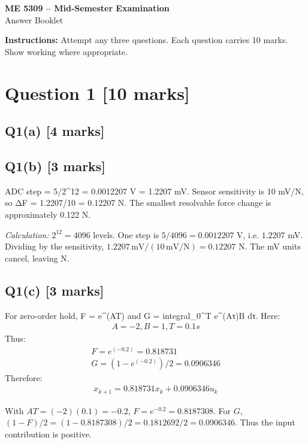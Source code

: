 \documentclass[11pt,a4paper]{article}
\begin{document}
\begin{center}
{\Large\bfseries ME 5309 -- Mid-Semester Examination}\\[3pt]
{\large Answer Booklet}\\[8pt]
\end{center}
\textbf{Instructions:} Attempt any three questions. Each question carries 10 marks. Show working where appropriate.
\section*{Question 1 \hfill [10 marks]}
\subsection*{Q1(a) \hfill [4 marks]}

\vspace{2mm}

\subsection*{Q1(b) \hfill [3 marks]}

ADC step = 5/2\textasciicircum{}12 = 0.0012207 V = 1.2207 mV.
Sensor sensitivity is 10 mV/N, so ΔF = 1.2207/10 = 0.12207 N.
The smallest resolvable force change is approximately 0.122 N.\par\smallskip\textit{Calculation:} $2^{12}=4096$ levels. One step is $5/4096=0.0012207$ V, i.e. $1.2207$ mV. Dividing by the sensitivity, $1.2207\,\mathrm{mV}/(10\,\mathrm{mV/N})=0.12207$ N. The mV units cancel, leaving N.

\subsection*{Q1(c) \hfill [3 marks]}

For zero-order hold, F = e\textasciicircum{}(AT) and G = integral\_0\textasciicircum{}T e\textasciicircum{}(Aτ)B dτ.
Here:\[\begin{aligned}A = -2, B = 1, T = 0.1 s\end{aligned}\]
Thus:\[\begin{aligned}F = e^(-0.2) = 0.818731\\ G = (1-e^(-0.2))/2 = 0.0906346\end{aligned}\]
Therefore:\[\begin{aligned}x_{k+1} = 0.818731 x_k + 0.0906346 u_k\end{aligned}\]\par\smallskip With $AT=(-2)(0.1)=-0.2$, $F=e^{-0.2}=0.8187308$. For $G$, $(1-F)/2=(1-0.8187308)/2=0.1812692/2=0.0906346$. Thus the input contribution is positive.
\end{document}
